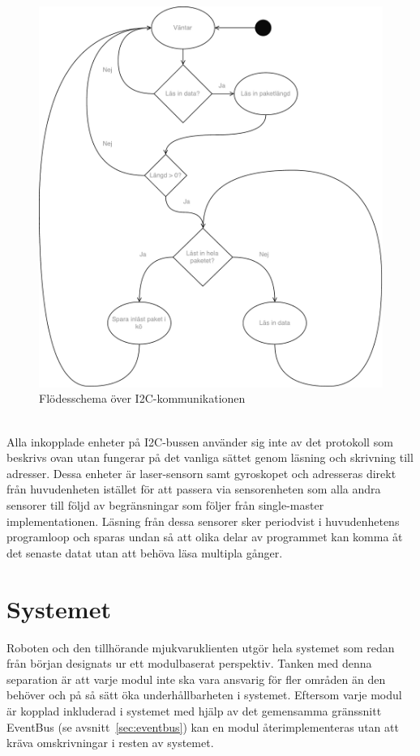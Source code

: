 \documentclass{article}
\begin{document}
\begin{figure}[H]
\centering
\includegraphics[scale=0.45]{Flodesschema_i2c}
\caption{Flödesschema över I2C-kommunikationen}
\label{fig:flodesschema_i2c}
\end{figure}
\ \\
\newline
Alla inkopplade enheter på I2C-bussen använder sig inte av det protokoll som beskrivs ovan utan fungerar på det vanliga sättet genom läsning och skrivning till adresser. Dessa enheter är laser-sensorn samt  gyroskopet och adresseras direkt från huvudenheten istället för att passera via sensorenheten som alla andra sensorer till följd av begränsningar som följer från single-master implementationen. Läsning från dessa sensorer sker periodvist i huvudenhetens programloop och sparas undan så att olika delar av programmet kan komma åt det senaste datat utan att behöva läsa multipla gånger.

\clearpage
\section{Systemet}
Roboten och den tillhörande mjukvaruklienten utgör hela systemet som redan från början designats ur ett modulbaserat perspektiv. Tanken med denna separation är att varje modul inte ska vara ansvarig för fler områden än den behöver och på så sätt öka underhållbarheten i systemet. Eftersom varje modul är kopplad inkluderad i systemet med hjälp av det gemensamma gränssnitt EventBus (se avsnitt~\ref{sec:eventbus}) kan en modul återimplementeras utan att kräva omskrivningar i resten av systemet.
\end{document}
